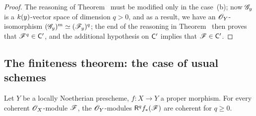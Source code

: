 \begin{proof}
\label{proof-3.3.1.3}
The reasoning of Theorem~ must be modified only in the case~(b); now $\mathscr{G}_y$ is a $k(y)$-vector space of dimension $q>0$, and as a result, we have an $\mathscr{O}_Y$-isomorphism $(\mathscr{G}_y)^m\simeq(\mathscr{F}_y)^q$; the end of the reasoning in Theorem~ then proves that $\mathscr{F}^q\in\mathsf{C}'$, and the additional hypothesis on $\mathsf{C}'$ implies that $\mathscr{F}\in\mathsf{C}'$.
\end{proof}

\subsection{The finiteness theorem: the case of usual schemes}
\label{subsection:finiteness-theorem-usual-case}

\begin{thm}[3.2.1]
\label{3.3.2.1}
Let $Y$ be a locally Noetherian prescheme, $f:X\to Y$ a proper morphism.
For every coherent $\mathscr{O}_X$-module $\mathscr{F}$, the $\mathscr{O}_Y$-modules $\mathsf{R}^q f_*(\mathscr{F})$ are coherent for $q\geq 0$.
\end{thm}

